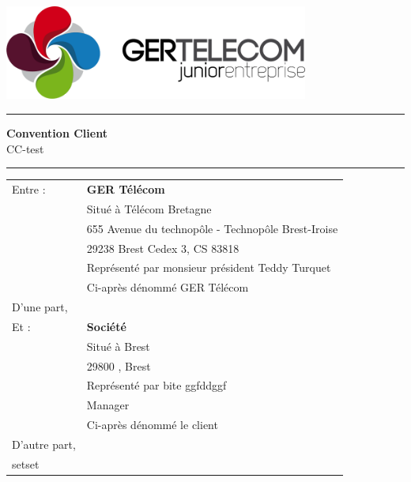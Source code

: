 \documentclass[10pt,a4paper]{article}
\renewcommand{\headrulewidth}{0pt}
\begin{document}
\centering
\includegraphics[width=10cm]{GER.png}\\
\rule{\linewidth}{.5pt}
\Huge \textbf{\textsf{Convention Client}}\\
\vspace{0.2cm}
\huge \textsf{CC-test}
\rule{\linewidth}{.5pt}
\normalsize
\flushleft
\vspace{1cm}
\begin{tabular}{ll}
Entre : 	&\textbf{GER Télécom}\\
&Situé à Télécom Bretagne \\
&655 Avenue du technopôle - Technopôle Brest-Iroise \\
&29238 Brest Cedex 3, CS 83818\\
&Représenté par monsieur président Teddy Turquet\\
\vspace{0.5cm}&Ci-après dénommé GER Télécom\\
\vspace{1cm}D'une part,\\
Et :		&\textbf{Société}\\
&Situé à Brest\\
&29800 , Brest\\
&Représenté par bite ggfddggf\\
&Manager\\
\vspace{0.5cm}&Ci-après dénommé le client\\
D'autre part,\\
setset
\end{tabular}
\newpage
\renewcommand{\headrulewidth}{0pt}

\lipsum[1]
\lipsum[1]
\lipsum[1]
\lipsum[1]
\lipsum[1]
\lipsum[1]
\lipsum[1]
\lipsum[1]
\lipsum[1]
\lipsum[1]
\lipsum[1]
\lipsum[1]
\lipsum[1]
\lipsum[1]
\lipsum[1]
\lipsum[1]
\lipsum[1]
\lipsum[1]
\end{document}
